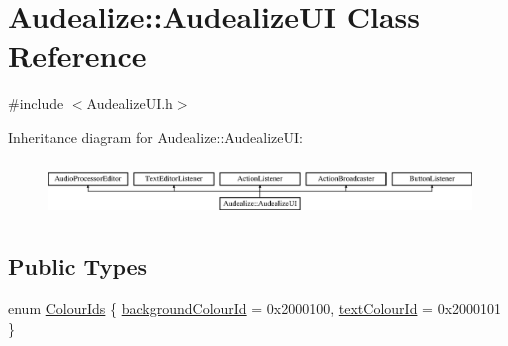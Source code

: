\hypertarget{class_audealize_1_1_audealize_u_i}{}\section{Audealize\+:\+:Audealize\+UI Class Reference}
\label{class_audealize_1_1_audealize_u_i}


{\ttfamily \#include $<$Audealize\+U\+I.\+h$>$}

Inheritance diagram for Audealize\+:\+:Audealize\+UI\+:\begin{figure}[H]
\begin{center}
\leavevmode
\includegraphics[height=1.503356cm]{class_audealize_1_1_audealize_u_i}
\end{center}
\end{figure}
\subsection*{Public Types}
\begin{DoxyCompactItemize}
\item 
enum \hyperlink{class_audealize_1_1_audealize_u_i_adc546ab367782c1aa6d8420d9786c0c1}{Colour\+Ids} \{ \hyperlink{class_audealize_1_1_audealize_u_i_adc546ab367782c1aa6d8420d9786c0c1ad891d56619a1d1e986de7568c16791c6}{background\+Colour\+Id} = 0x2000100, 
\hyperlink{class_audealize_1_1_audealize_u_i_adc546ab367782c1aa6d8420d9786c0c1a36cc2511875aeb658835ecefe2000219}{text\+Colour\+Id} = 0x2000101
 \}
\end{DoxyCompactItemize}
